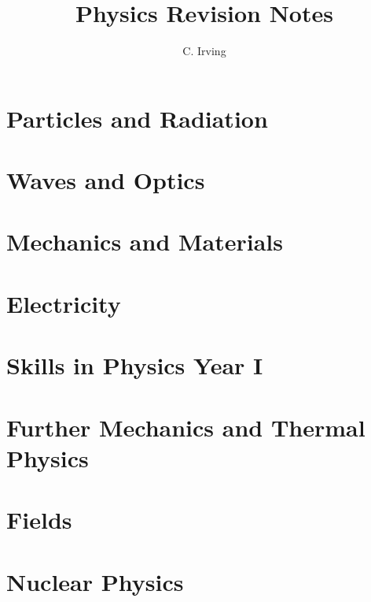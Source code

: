 \documentclass{book}
\title{\Huge Physics Revision Notes}
\author{C. Irving}
\date{}
\begin{document}
\maketitle

\tableofcontents

\mainmatter

\chapter{Particles and Radiation} \label{ch:particles_and_radiation}
    

\chapter{Waves and Optics} \label{ch:waves_and_optics}
    

\chapter{Mechanics and Materials} \label{ch:mechanics_and_materials}
    

\chapter{Electricity} \label{ch:electricity}
    

\chapter{Skills in Physics Year I} \label{ch:skills_in_physics_i}
    

\chapter{Further Mechanics and Thermal Physics} \label{ch:further_mechanics_and_thermal_physics}
    

\chapter{Fields} \label{ch:fields}
    

\chapter{Nuclear Physics} \label{ch:nuclear_physics}
    
\end{document}
